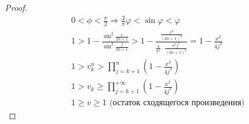 \documentclass[../main.tex]{subfiles}
\begin{document}
\begin{theorem}
\begin{proof}
\begin{gather*}
    0<\phi<\frac{\pi}{2} \Rightarrow \frac{2}{\pi}\varphi < \sin \varphi < \varphi \\
    1>1-\frac{\sin^2\frac{x}{2n+1}}{\sin^2\frac{j}{2n+1}}>
    1-\frac{\frac{x^2}{(2n+1)^2}}{\frac{4}{\pi^2}\cdot\frac{\pi^2 j^2}{(2n+1)^2}}=
    1-\frac{x^2}{4j^2}\\
    1>v_k^n>\prod_{j=k+1}^{n}\left(1-\frac{x^2}{4j^2}\right)\\
    1>v_k\ge\prod_{j=k+1}^{+\infty}\left(1-\frac{x^2}{4j^2}\right)\\
    1\ge v \ge 1 \text{ (остаток сходящегося произведения)}
\end{gather*}
\end{proof}
\end{theorem}
\newpage
\end{document}
